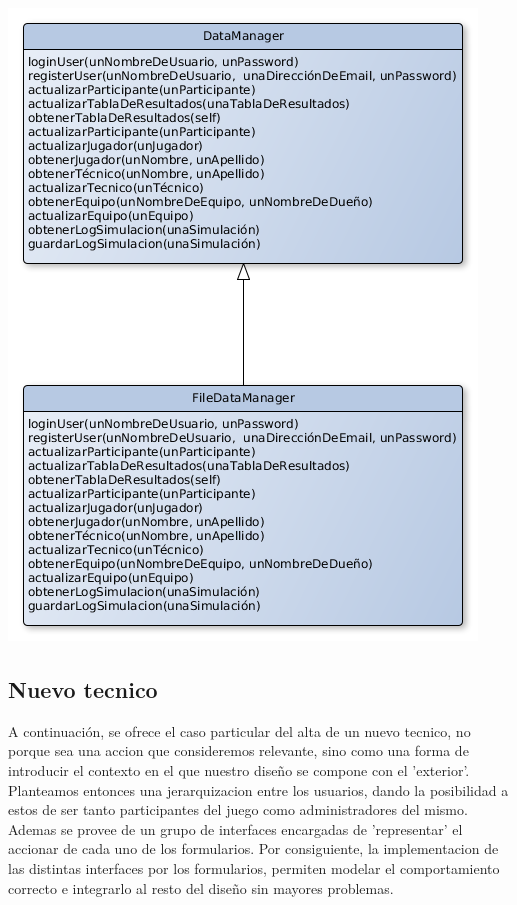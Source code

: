 \begin{center}
\includegraphics[scale=0.4]{diagramas/data_manager.png} 
\end{center}

\subsection{Nuevo tecnico}
A continuación, se ofrece el caso particular del alta de un nuevo tecnico, no porque sea una accion que consideremos relevante, sino como una forma de introducir el contexto en el que nuestro diseño se compone con el 'exterior'. Planteamos entonces una jerarquizacion entre los usuarios, dando la posibilidad a estos de ser tanto participantes del juego como administradores del mismo. Ademas se provee de un grupo de interfaces encargadas de 'representar' el accionar de cada uno de los formularios. Por consiguiente, la implementacion de las distintas interfaces por los formularios, permiten modelar el comportamiento correcto e integrarlo al resto del diseño sin mayores problemas.

